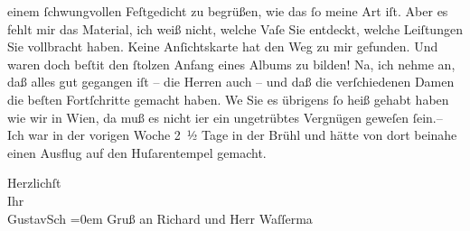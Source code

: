                einem{ }ſchwungvollen Feſtgedicht zu begrüßen, wie das{ }ſo meine Art iſt. Aber es fehlt
               mir das Material, ich weiß nicht, welche Vaſe Sie entdeckt, welche Leiſtungen Sie
               vollbracht haben. Keine Anſichtskarte hat den Weg zu mir gefunden. Und \label{T_L04296-1v}\label{T_L04296-1} waren doch beſti{\geminationm}t den{ }ſtolzen Anfang eines Albums zu bilden! Na, ich
               nehme an, daß alles gut gegangen iſt – die Herren auch – und daß die verſchiedenen
               Damen die beſten Fortſchritte gemacht haben. We{\geminationn} Sie es
               übrigens{ }ſo heiß gehabt haben wie wir in Wien,
                  da{\geminationn} muß es nicht i{\geminationm}er
               ein ungetrübtes Vergnügen geweſen{ }ſein.– Ich war in der vorigen Woche 2 ½ Tage
               in der Brühl und hätte von dort beinahe einen
               Ausflug auf den Huſarentempel gemacht.\pend
           
\pstart
           Herzlichſt{\\[\baselineskip]}Ihr{\\[\baselineskip]}\spacefill\mbox{GustavSch}\pend
           \leftskip=0em{}
\pstart
           \noindent{}Gruß an Richard und Herr Waſſerma{\geminationn}\pend
           \endnumbering{}
\begin{anhang}
\end{anhang}\newcommand{\dateiname}{L04296}\newcommand{\titel}{Gustav Schwarzkopf an Arthur Schnitzler, [8. oder 9]. 8. 1899}\newcommand{\editorInnen}{Herausgegeben von Jahnke, SelmaMüller, Martin Anton}
